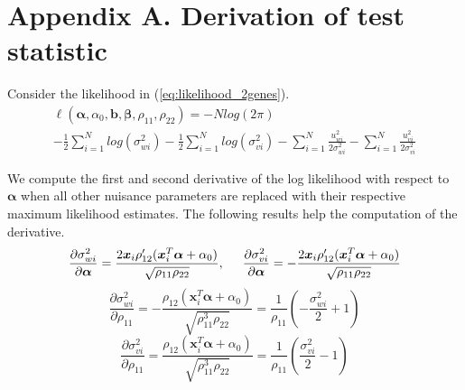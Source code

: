\documentclass[aap,authoryear, preprint]{imsart}
\numberwithin{equation}{section}
\theoremstyle{plain}
\begin{document}


 
\pagebreak
 
\section*{Appendix A. Derivation of test statistic}
Consider the likelihood in (\ref{eq:likelihood_2genes}).
\begin{equation}
\begin{multlined}
\ell(\bm{\alpha}, \alpha_0, \bm{b}, \bm{\beta}, \rho_{11}, \rho_{22}) 
= -N log(2\pi) \\ - \frac{1}{2} \sum_{i=1}^{N} log(\sigma_{wi}^2) - \frac{1}{2} \sum_{i=1}^{N} log(\sigma_{vi}^2) - \sum_{i=1}^{N} \frac{u_{wi}^2}{2\sigma_{wi}^2} - \sum_{i=1}^{N} \frac{u_{vi}^2}{2\sigma_{vi}^2}
\end{multlined}
    \label{eq:likelihood_2genes_appendix}
\end{equation}

We compute the first and second derivative of the log likelihood with respect to $\bm{\alpha}$ when all other nuisance parameters are replaced with their respective maximum likelihood estimates. The following results help the computation of the derivative.
$$
\frac{\partial \sigma_{wi}^2}{\partial \bm{\alpha}} = \frac{2\bm{x}_i \rho_{12}'(\bm{x}_i^T \bm{\alpha} + \alpha_0)}{\sqrt{\rho_{11}\rho_{22}}}, \hspace{5mm}
\frac{\partial \sigma_{vi}^2}{\partial \bm{\alpha}} = -\frac{2\bm{x}_i \rho_{12}'(\bm{x}_i^T \bm{\alpha} + \alpha_0)}{\sqrt{\rho_{11}\rho_{22}}}
$$
$$\frac{\partial \sigma_{wi}^2}{\partial \rho_{11}} = -\frac{\rho_{12}(\bm{x}_i^T\bm{\alpha} + \alpha_0)}{\sqrt{\rho_{11}^3\rho_{22}}} = \frac{1}{\rho_{11}}\left(-\frac{\sigma_{wi}^2}{2} + 1\right)$$
$$\frac{\partial \sigma_{vi}^2}{\partial \rho_{11}} = \frac{\rho_{12}(\bm{x}_i^T\bm{\alpha} + \alpha_0)}{\sqrt{\rho_{11}^3\rho_{22}}} = \frac{1}{\rho_{11}}\left(\frac{\sigma_{vi}^2}{2} - 1\right)$$
\end{document}
